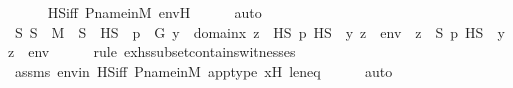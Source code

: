 \begin{isabellebody}
\ \ \ \ \isamarkupfalse%
\ HS{\isacharunderscore}{\kern0pt}iff\ P{\isacharunderscore}{\kern0pt}name{\isacharunderscore}{\kern0pt}in{\isacharunderscore}{\kern0pt}M\ env{\isacharprime}{\kern0pt}H\isanewline
\ \ \ \ \isamarkupfalse%
\ auto\isanewline
\isanewline
\ \ \isamarkupfalse%
\ {\isachardoublequoteopen}{\isasymexists}S{\isachardot}{\kern0pt}\ S\ {\isasymin}\ M\ {\isasymand}\ S\ {\isasymsubseteq}\ HS\ {\isasymand}\ {\isacharparenleft}{\kern0pt}{\isasymforall}p\ {\isasymin}\ G{\isachardot}{\kern0pt}\ {\isasymforall}y\ {\isasymin}\ domain{\isacharparenleft}{\kern0pt}x{\isacharprime}{\kern0pt}{\isacharparenright}{\kern0pt}{\isachardot}{\kern0pt}\ {\isacharparenleft}{\kern0pt}{\isasymexists}z\ {\isasymin}\ HS{\isachardot}{\kern0pt}\ p\ {\isasymtturnstile}HS\ {\isasymphi}\ {\isacharparenleft}{\kern0pt}{\isacharbrackleft}{\kern0pt}y{\isacharcomma}{\kern0pt}\ z{\isacharbrackright}{\kern0pt}\ {\isacharat}{\kern0pt}\ env{\isacharprime}{\kern0pt}{\isacharparenright}{\kern0pt}{\isacharparenright}{\kern0pt}\ {\isasymlongleftrightarrow}\ {\isacharparenleft}{\kern0pt}{\isasymexists}z\ {\isasymin}\ S{\isachardot}{\kern0pt}\ p\ {\isasymtturnstile}HS\ {\isasymphi}\ {\isacharparenleft}{\kern0pt}{\isacharbrackleft}{\kern0pt}y{\isacharcomma}{\kern0pt}\ z{\isacharbrackright}{\kern0pt}\ {\isacharat}{\kern0pt}\ env{\isacharprime}{\kern0pt}{\isacharparenright}{\kern0pt}{\isacharparenright}{\kern0pt}{\isacharparenright}{\kern0pt}{\isachardoublequoteclose}\ \isanewline
\ \ \ \ \isamarkupfalse%
{\isacharparenleft}{\kern0pt}rule\ ex{\isacharunderscore}{\kern0pt}hs{\isacharunderscore}{\kern0pt}subset{\isacharunderscore}{\kern0pt}contains{\isacharunderscore}{\kern0pt}witnesses{\isacharparenright}{\kern0pt}\isanewline
\ \ \ \ \isamarkupfalse%
\ assms\ env{\isacharprime}{\kern0pt}in\ HS{\isacharunderscore}{\kern0pt}iff\ P{\isacharunderscore}{\kern0pt}name{\isacharunderscore}{\kern0pt}in{\isacharunderscore}{\kern0pt}M\ app{\isacharunderscore}{\kern0pt}type\ x{\isacharprime}{\kern0pt}H\ leneq\isanewline
\ \ \ \ \isamarkupfalse%
\ auto\isanewline
\ \ \isamarkupfalse%
\ \isamarkupfalse%

\end{isabellebody}
